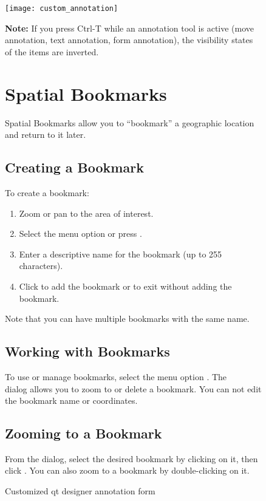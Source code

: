 \begin{figure}[ht]
   \centering
   \texttt{[image: custom\_annotation]}
   \caption{Customized qt designer annotation form \nixcaption}
   \label{fig:custom-annotations}

\textbf{Note:} If you press Ctrl-T while an annotation tool is active 
(move annotation, text annotation, form annotation), the visibility states 
of the items are inverted.

\newpage

\section{Spatial Bookmarks}\label{sec:bookmarks}

Spatial Bookmarks allow you to ``bookmark'' a geographic location and return to it later.

\subsection{Creating a Bookmark}
To create a bookmark:
\begin{enumerate}
\item Zoom or pan to the area of interest.
\item Select the menu option  \arrow {} or press .
\item Enter a descriptive name for the bookmark (up to 255 characters).
\item Click  to add the bookmark or  to exit without adding the bookmark.
\end{enumerate}

Note that you can have multiple bookmarks with the same name.

\subsection{Working with Bookmarks}
To use or manage bookmarks, select the menu
option  \arrow {}. The \\
 dialog allows you to zoom to or delete a bookmark.
You can not edit the bookmark name or coordinates.

\subsection{Zooming to a Bookmark}
From the  dialog, select the desired bookmark by clicking on it,
then click .
You can also zoom to a bookmark by double-clicking on it.


\end{figure}
